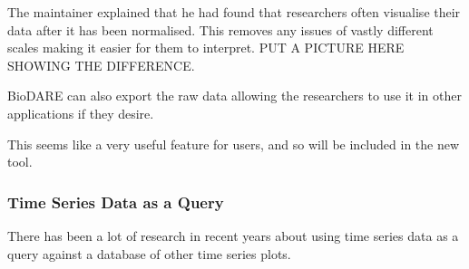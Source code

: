 The maintainer explained that he had found that researchers often visualise their data after it has been normalised.  This removes any issues of vastly different scales making it easier for them to interpret. PUT A PICTURE HERE SHOWING THE DIFFERENCE.

BioDARE can also export the raw data allowing the researchers to use it in other applications if they desire.

This seems like a very useful feature for users, and so will be included in the new tool.

\subsubsection{Time Series Data as a Query}

There has been a lot of research in recent years about using time series data as a query against a database of other time series plots.
